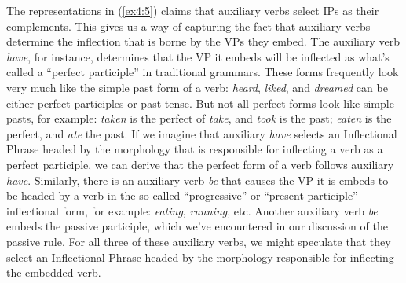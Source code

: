 The representations in (\ref{ex4:5}) claims that auxiliary verbs select IPs as their complements. This gives us a way of capturing the fact that auxiliary verbs determine the inflection that is borne by the VPs they embed. The auxiliary verb \emph{have}, for instance, determines that the VP it embeds will be inflected as what's called a ``perfect participle'' in traditional grammars. These forms frequently look very much like the simple past form of a verb: \emph{heard}, \emph{liked}, and \textit{dreamed} can be either perfect participles or past tense. But not all perfect forms look like simple pasts, for example: \emph{taken} is the perfect of \textit{take}, and \textit{took} is the past; \emph{eaten} is the perfect, and \textit{ate} the past. If we imagine that auxiliary \emph{have} selects an Inflectional Phrase headed by the morphology that is responsible for inflecting a verb as a perfect participle, we can derive that the perfect form of a verb follows auxiliary \textit{have}. Similarly, there is an auxiliary verb \emph{be} that causes the VP it is embeds to be headed by a verb in the so-called ``progressive'' or ``present participle'' inflectional form, for example: \emph{eating}, \emph{running}, etc. Another auxiliary verb \emph{be} embeds the passive participle, which we've encountered in our discussion of the passive rule. For all three of these auxiliary verbs, we might speculate that they select an Inflectional Phrase headed by the morphology responsible for inflecting the embedded verb.

